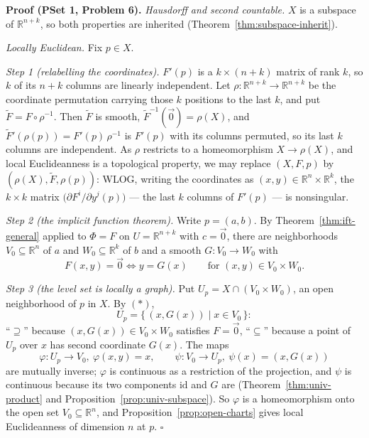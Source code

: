 \documentclass[11pt]{report}
\renewenvironment{proof}[1][Proof]{\noindent\textbf{#1.} }{\hfill$\square$\par\vspace{5pt}}
\begin{document}
\begin{proof}[Proof (PSet 1, Problem 6)]
\emph{Hausdorff and second countable.} $X$ is a subspace of $\mathbb{R}^{n+k}$, so both properties are inherited (Theorem~\ref{thm:subspace-inherit}).

\emph{Locally Euclidean.} Fix $p \in X$.

\emph{Step 1 (relabelling the coordinates).} $F'(p)$ is a $k \times (n+k)$ matrix of rank $k$, so $k$ of its $n+k$ columns are linearly independent. Let $\rho : \mathbb{R}^{n+k} \to \mathbb{R}^{n+k}$ be the coordinate permutation carrying those $k$ positions to the last $k$, and put $\widetilde F = F \circ \rho^{-1}$. Then $\widetilde F$ is smooth, $\widetilde F^{-1}(\vec 0) = \rho(X)$, and $\widetilde F'(\rho(p)) = F'(p)\,\rho^{-1}$ is $F'(p)$ with its columns permuted, so its last $k$ columns are independent. As $\rho$ restricts to a homeomorphism $X \to \rho(X)$, and local Euclideanness is a topological property, we may replace $(X, F, p)$ by $(\rho(X), \widetilde F, \rho(p))$: WLOG, writing the coordinates as $(x,y) \in \mathbb{R}^n \times \mathbb{R}^k$, the $k \times k$ matrix $\big(\partial F^i/\partial y^j (p)\big)$ --- the last $k$ columns of $F'(p)$ --- is nonsingular.

\emph{Step 2 (the implicit function theorem).} Write $p = (a,b)$. By Theorem~\ref{thm:ift-general} applied to $\Phi = F$ on $U = \mathbb{R}^{n+k}$ with $c = \vec 0$, there are neighborhoods $V_0 \subseteq \mathbb{R}^n$ of $a$ and $W_0 \subseteq \mathbb{R}^k$ of $b$ and a smooth $G : V_0 \to W_0$ with
\[
F(x,y) = \vec 0 \iff y = G(x) \qquad \text{for } (x,y) \in V_0 \times W_0. \tag{$\ast$}
\]

\emph{Step 3 (the level set is locally a graph).} Put $U_p = X \cap (V_0 \times W_0)$, an open neighborhood of $p$ in $X$. By $(\ast)$,
\[
U_p = \{\, (x, G(x)) \mid x \in V_0 \,\} :
\]
``$\supseteq$'' because $(x,G(x)) \in V_0 \times W_0$ satisfies $F = \vec 0$, ``$\subseteq$'' because a point of $U_p$ over $x$ has second coordinate $G(x)$. The maps
\[
\varphi : U_p \to V_0,\ \varphi(x,y) = x, \qquad \psi : V_0 \to U_p,\ \psi(x) = (x, G(x))
\]
are mutually inverse; $\varphi$ is continuous as a restriction of the projection, and $\psi$ is continuous because its two components $\mathrm{id}$ and $G$ are (Theorem~\ref{thm:univ-product} and Proposition~\ref{prop:univ-subspace}). So $\varphi$ is a homeomorphism onto the open set $V_0 \subseteq \mathbb{R}^n$, and Proposition~\ref{prop:open-charts} gives local Euclideanness of dimension $n$ at $p$.
\end{proof}
\end{document}
